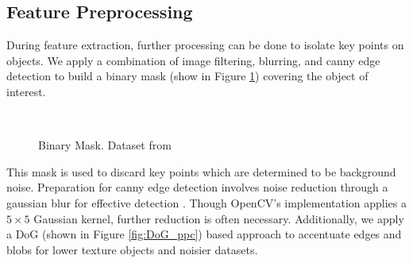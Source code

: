 \documentclass[conference,compsoc]{IEEEtran}
\begin{document}
\subsection{Feature Preprocessing}
During feature extraction, further processing can be 
done to isolate key points on objects. We apply a combination of 
image filtering, blurring, and canny edge detection to build a binary mask
(show in Figure \ref{fig:mask}) covering the object of interest. 
\begin{figure}[ht!]
    \centering
    \
    \caption{Binary Mask. Dataset from \cite{temple}}
    \label{fig:mask}
\end{figure}
This mask is used to discard key points which are determined to be background noise.
Preparation for canny edge detection involves noise reduction through a gaussian blur
for effective detection \cite{ced}. Though OpenCV's implementation \cite{ced_ocv}
applies a $5\times 5$ Gaussian kernel, further reduction is often necessary.
Additionally, we apply a DoG (shown in Figure \ref{fig:DoG_ppc}) based approach to accentuate edges and blobs 
for lower texture objects and noisier datasets. 
\end{document}
